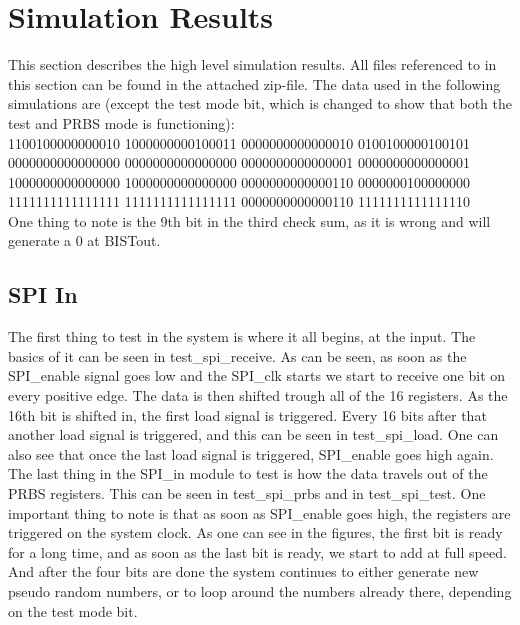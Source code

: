 \section{Simulation Results} \label{sec:simulation_results}
This section describes the high level simulation results. All files referenced to in this section can be found in the attached zip-file. The data used in the following simulations are (except the test mode bit, which is changed to show that both the test and PRBS mode is functioning): \\
1100100000000010	1000000000100011	0000000000000010	0100100000100101\\
0000000000000000	0000000000000000	0000000000000001	0000000000000001\\
1000000000000000	1000000000000000	0000000000000110	0000000100000000\\
1111111111111111	1111111111111111	0000000000000110	1111111111111110\\
One thing to note is the 9th bit in the third check sum, as it is wrong and will generate a 0 at BISTout.
\subsection{SPI In}
The first thing to test in the system is where it all begins, at the input. The basics of it can be seen in test\_spi\_receive. As can be seen, as soon as the SPI\_enable signal goes low and the SPI\_clk starts we start to receive one bit on every positive edge. The data is then shifted trough all of the 16 registers. As the 16th bit is shifted in, the first load signal is triggered. Every 16 bits after that another load signal is triggered, and this can be seen in test\_spi\_load. One can also see that once the last load signal is triggered, SPI\_enable goes high again.\\
The last thing in the SPI\_in module to test is how the data travels out of the PRBS registers. This can be seen in test\_spi\_prbs and in test\_spi\_test. One important thing to note is that as soon as SPI\_enable goes high, the registers are triggered on the system clock. As one can see in the figures, the first bit is ready for a long time, and as soon as the last bit is ready, we start to add at full speed. And after the four bits are done the system continues to either generate new pseudo random numbers, or to loop around the numbers already there, depending on the test mode bit. 


